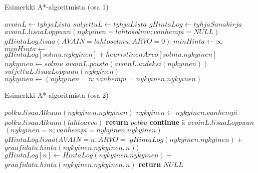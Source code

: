 \begin{algorithm}
\caption{Esimerkki A*-algoritmista (osa 1)}\label{AStarEsim}
\begin{algorithmic}
	\State $avoinL \gets tyhjaLista$
	\State $suljettuL \gets tyhjaLista$
	\State $gHintaLog \gets tyhjaSanakirja$
	\State $avoinL.lisaaLoppuun(nykyinen=lahtosolmu;vanhempi=NULL)$
	\State $gHintaLog.lisaa(AVAIN=lahtosolmu;ARVO=0)$
		\State $minHinta \gets \infty$
				\State $minHinta \gets$
				\State $gHintaLog[solmu.nykyinen]+heuristinenArvo[solmu.nykyinen]$
				\State $nykyinen \gets solmu$
			\EndIf
		\EndFor
		\State $avoinL.poista(avoinL.indeksi(nykyinen))$
		\State $suljettuL.lisaaLoppuun(nykyinen)$
				\State $nykyinen \gets (nykyinen=n;vanhempi=nykyinen.nykyinen)$

\end{algorithmic}
\end{algorithm}
\begin{algorithm}
\caption{Esimerkki A*-algoritmista (osa 2)}
\begin{algorithmic}

					\State $polku.lisaaAlkuun(nykyinen.nykyinen)$
					\State $nykyinen \gets nykyinen.vanhempi$
				\EndWhile
				\State $polku.lisaaAlkuun(lahtoarvo)$
				\State \textbf{return} $polku$
			\EndIf
				\State \textbf{continue} $ä$
			\Else
					\State $avoinL.lisaaLoppuun$
					\State $(nykyinen=n;vanhempi=nykyinen.nykyinen)$
					\State $gHintaLog.lisaa(AVAIN=n;ARVO=$
					\State $gHintaLog(nykyinen.nykyinen)+$
					\State $graafidata.hinta(nykyinen.nykyinen,n))$
				\Else
						\State $gHintaLog[n] \gets HintaLog(nykyinen.nykyinen)+$ 
						\State $graafidata.hinta(nykyinen.nykyinen,n)$
					\EndIf
				\EndIf
			\EndIf
		\EndFor
	\EndWhile
	\State \textbf{return} $NULL$
\EndProcedure
\end{algorithmic}
\end{algorithm}

